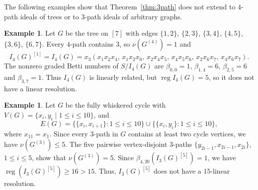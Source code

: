 \documentclass{amsart}
\DeclareMathOperator{\reg}{reg}
\theoremstyle{definition}
\newtheorem{Example}[Theorem]{Example}
\theoremstyle{remark}
\begin{document}

The following examples show that Theorem~\ref{thm:3path} does not extend to $4$-path ideals of trees or to $3$-path ideals of arbitrary graphs.


\begin{Example}\label{ex:four-paths}
Let $G$ be the tree on $[7]$ with edges $\{1,2\}$, $\{2,3\}$, $\{3,4\}$, $\{4,5\}$, $\{3,6\}$, $\{6,7\}$. Every $4$-path contains $3$, so $\nu(G^{(4)})=1$ and
\[
I_4(G)^{[1]}=I_4(G)=x_3(x_1x_2x_4,\,x_1x_2x_6,\,x_2x_4x_5,\,x_4x_5x_6,\,x_2x_6x_7,\,x_4x_6x_7).
\]
The nonzero graded Betti numbers of $S/I_4(G)$ are $\beta_{0,0}=1$, $\beta_{1,4}=6$, $\beta_{2,5}=6$ and $\beta_{3,7}=1$. Thus $I_4(G)$ is linearly related, but
$\reg I_4(G)=5$, so it does not have a linear resolution.
\end{Example}


\begin{Example} \label{ex.arbG}
    Let $G$ be the fully whiskered cycle with  $V(G)=\{x_i,y_i\mid 1\leq i\leq 10\}$, and $$E(G)=\bigl\{\{x_i,x_{i+1}\}:1\leq i\leq 10\bigr\} \cup \bigl\{\{x_i,y_i\}:1\leq i\leq 10\bigr\},$$ where $x_{11}=x_1$. Since every $3$-path in $G$ contains at least two cycle vertices, we have $\nu(G^{(3)})\leq 5$. The five pairwise vertex-disjoint $3$-paths $\{y_{2i-1},x_{2i-1},x_{2i}\}$, $1\leq i\leq 5$, show that $\nu(G^{(3)})=5$. Since $\beta_{4,20}(I_3(G)^{[5]})=1$, we have $\reg(I_3(G)^{[5]})\geq 16>15$. Thus, $I_3(G)^{[5]}$ does not have a $15$-linear resolution.
\end{Example}
\end{document}
